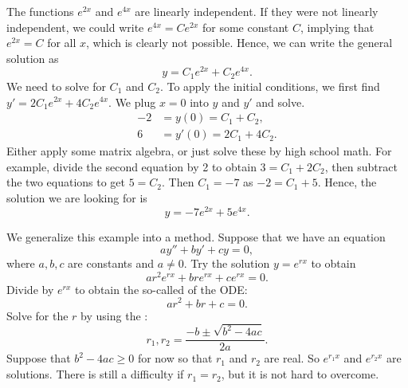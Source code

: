 The functions $e^{2x}$ and $e^{4x}$ are linearly independent.  If they
were not linearly independent, we could write $e^{4x} = C e^{2x}$ for
some constant $C$,
implying that $e^{2x} = C$ for all $x$, which is clearly not possible. 
Hence, we can write the general solution as
\begin{equation*}
y = C_1 e^{2x} + C_2 e^{4x} .
\end{equation*}
We need to solve for $C_1$ and $C_2$.  To apply the initial conditions,
we first find $y' = 2 C_1 e^{2x} + 4 C_2 e^{4x}$.  We plug $x=0$ into
$y$ and $y'$ and solve.
\begin{equation*}
\begin{aligned}
-2 & = y(0) = C_1 + C_2 , \\
6 & = y'(0) = 2 C_1 + 4 C_2 .
\end{aligned}
\end{equation*}
Either apply some matrix algebra, or just solve these by high school
math.  For example, divide the second equation by 2
to obtain $3 = C_1 + 2 C_2$, then subtract the two equations to
get $5 = C_2$.  Then $C_1 = -7$ as $-2 = C_1 + 5$.  Hence, the solution we
are
looking for is
\begin{equation*}
y = -7 e^{2x} + 5 e^{4x} .
\end{equation*}

\medskip

We generalize this example into a method.
Suppose that we have an equation
\begin{equation} \label{ccsol:eq}
a y'' + b y' + c y = 0 ,
\end{equation}
where $a, b, c$ are constants and $a \neq 0$.  Try the solution $y = e^{rx}$ to obtain
\begin{equation*}
a r^2 e^{rx} + 
b r e^{rx} + 
c e^{rx} = 0 .
\end{equation*}
Divide by $e^{rx}$ to obtain the so-called
\emph{} of the ODE:
\begin{equation*}
a r^2 + 
b r + 
c = 0 .
\end{equation*}
Solve for the $r$ by using the :
\begin{equation*}
r_1, r_2 = \frac{-b \pm \sqrt{b^2 - 4ac}}{2a} .
\end{equation*}
Suppose that $b^2 -4ac \geq 0$ for now so that $r_1$ and $r_2$ are real.
So $e^{r_1 x}$ and $e^{r_2 x}$ are solutions.  There is
still a difficulty if $r_1 = r_2$, but it is not hard to overcome.

